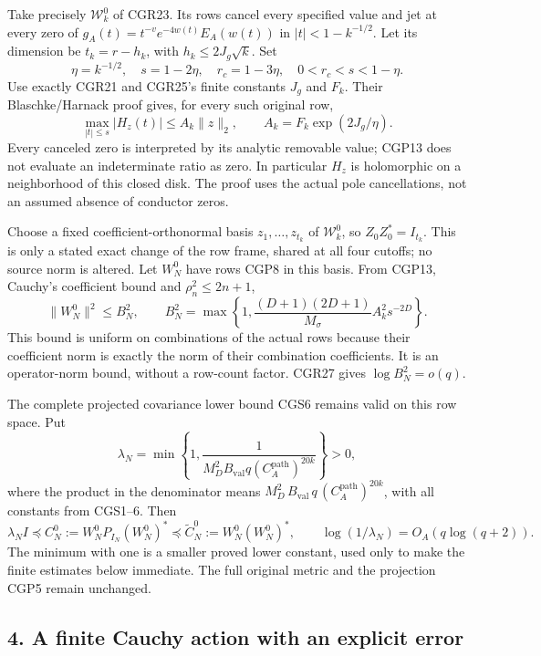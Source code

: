 Take precisely \(\mathcal W_k^0\) of CGR23. Its rows cancel every specified value and jet at every zero of \(g_A(t)=t^{-v}e^{-4w(t)}E_A(w(t))\) in \(|t|<1-k^{-1/2}\). Let its dimension be \(t_k=r-h_k\), with \(h_k\le2J_g\sqrt k\). Set \[
\eta=k^{-1/2},\quad s=1-2\eta,\quad r_c=1-3\eta,
\quad 0<r_c<s<1-\eta.
\tag{CGP12}
\] Use exactly CGR21 and CGR25's finite constants \(J_g\) and \(F_k\). Their Blaschke/Harnack proof gives, for every such original row, \[
\max_{|t|\le s}|H_z(t)|\le A_k\|z\|_2,
\qquad A_k=F_k\exp(2J_g/\eta).
\tag{CGP13}
\] Every canceled zero is interpreted by its analytic removable value; CGP13 does not evaluate an indeterminate ratio as zero. In particular \(H_z\) is holomorphic on a neighborhood of this closed disk. The proof uses the actual pole cancellations, not an assumed absence of conductor zeros.

Choose a fixed coefficient-orthonormal basis \(z_1,\ldots,z_{t_k}\) of \(\mathcal W_k^0\), so \(Z_0Z_0^*=I_{t_k}\). This is only a stated exact change of the row frame, shared at all four cutoffs; no source norm is altered. Let \(W_N^0\) have rows CGP8 in this basis. From CGP13, Cauchy's coefficient bound and \(\rho_n^2\le2n+1\), \[
\|W_N^0\|^2\le B_N^2,
\qquad
B_N^2=\max\left\{1,
\frac{(D+1)(2D+1)}{M_\sigma}A_k^2s^{-2D}\right\}.
\tag{CGP14}
\] This bound is uniform on combinations of the actual rows because their coefficient norm is exactly the norm of their combination coefficients. It is an operator-norm bound, without a row-count factor. CGR27 gives \(\log B_N^2=o(q)\).

The complete projected covariance lower bound CGS6 remains valid on this row space. Put \[
\lambda_N=\min\left\{1,
\frac1{M_D^2B_{\mathrm{val}}q
(C_A^{\mathrm{path}})^{20k}}\right\}>0,
\tag{CGP15}
\] where the product in the denominator means \(M_D^2\,B_{\mathrm{val}}\,q\,(C_A^{\mathrm{path}})^{20k}\), with all constants from CGS1--6. Then \[
\lambda_N I\preceq C_N^0:=W_N^0P_{I_N}(W_N^0)^*
\preceq\widetilde C_N^0:=W_N^0(W_N^0)^*,\qquad
\log(1/\lambda_N)=O_A(q\log(q+2)).
\tag{CGP16}
\] The minimum with one is a smaller proved lower constant, used only to make the finite estimates below immediate. The full original metric and the projection CGP5 remain unchanged.

\subsection{4. A finite Cauchy action with an explicit error}\label{a-finite-cauchy-action-with-an-explicit-error}

